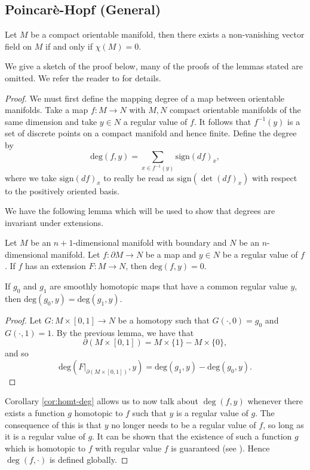\documentclass[12pt,a4paper]{article}
\begin{document}
\subsection{Poincar\`{e}-Hopf (General) \label{sec:ph-gen-sec}}
\begin{theorem}
Let $M$ be a compact orientable manifold, then there exists a non-vanishing vector field on $M$ if and only if $\chi(M)=0$.
\end{theorem}
We give a sketch of the proof below, many of the proofs of the lemmas stated are omitted. We refer the reader to \cite{wrightPoincare} for details.
\begin{proof}
We must first define the mapping degree of a map between orientable manifolds. Take a map $f:M\to N$ with $M,N$ compact orientable manifolds of the same dimension and take $y\in N$ a regular value of $f$. It follows that $f^{-1}(y)$ is a set of discrete points on a compact manifold and hence finite. Define the degree by
\[
\mathrm{deg}(f,y)=\sum_{x\in f^{-1}(y)}\mathrm{sign}(df)_x,
\]
where we take $\mathrm{sign}(df)_x$ to really be read as $\mathrm{sign}(\det(df)_x)$ with respect to the positively oriented basis.

We have the following lemma which will be used to show that degrees are invariant under extensions.
\begin{lemma}
Let $M$ be an $n+1$-dimensional manifold with boundary and $N$ be an $n$-dimensional manifold. Let $f:\partial M\to N$ be a map and $y\in N$ be a regular value of $f$. If $f$ has an extension $F:M\to N$, then $\mathrm{deg}(f,y)=0$.
\end{lemma}
\begin{corollary}
If $g_0$ and $g_1$ are smoothly homotopic maps that have a common regular value $y$, then $\mathrm{deg}(g_0,y)=\mathrm{deg}(g_1,y)$.
\label{cor:homt-deg}
\end{corollary}
\begin{proof}
Let $G:M\times [0,1]\to N$ be a homotopy such that $G(\cdot,0)=g_0$ and $G(\cdot,1)=1$. By the previous lemma, we have that
\[
\partial(M\times [0,1])=M\times\{1\}- M\times\{0\},
\]
and so
\[
\mathrm{deg}(F\rvert_{\partial(M\times [0,1])},y)=\mathrm{deg}(g_1,y)-\mathrm{deg}(g_0,y).
\]
\end{proof}
Corollary \ref{cor:homt-deg} allows us to now talk about $\deg(f,y)$ whenever there exists a function $g$ homotopic to $f$ such that $y$ is a regular value of $g$. The consequence of this is that $y$ no longer needs to be a regular value of $f$, so long as it is a regular value of $g$. It can be shown that the existence of such a function $g$ which is homotopic to $f$ with regular value $f$ is guaranteed (see \cite{BurnsGidea,wrightPoincare}). Hence $\deg(f,\cdot)$ is defined globally.


\end{proof}
\end{document}
